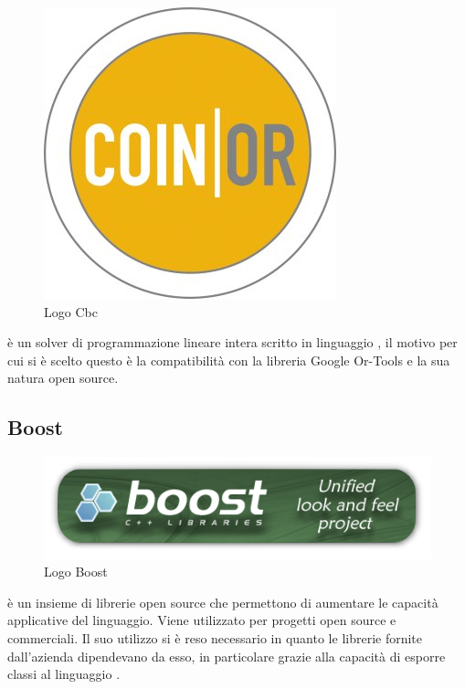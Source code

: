 \begin{figure}[H]
	\begin{center} \includegraphics[scale=0.8]{figures/coin_banner}
		\caption[Logo Cbc]{Logo Cbc}  
	\end{center}
\end{figure}
 è un solver di programmazione lineare intera scritto in linguaggio , il motivo per cui si è scelto questo è la compatibilità con la libreria Google Or-Tools e la sua natura open source.

\subsection{Boost}
\begin{figure}[H]
	\begin{center} \includegraphics[scale=0.8]{figures/boost}
		\caption[Logo Boost]{Logo Boost}
	\end{center}
\end{figure}
 è un insieme di librerie  open source che permettono di aumentare le capacità applicative del linguaggio. Viene utilizzato per progetti open source e commerciali. Il suo utilizzo si è reso necessario in quanto le librerie fornite dall'azienda dipendevano da esso, in particolare grazie alla capacità di esporre classi  al linguaggio .

